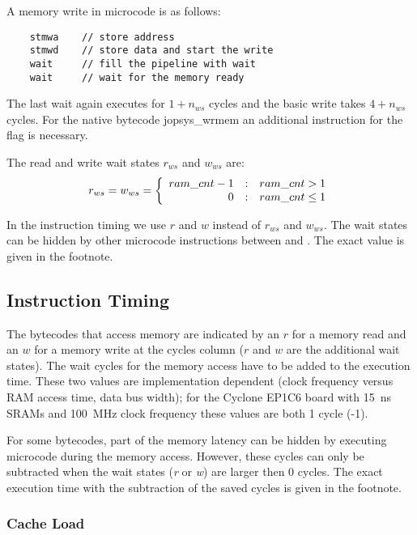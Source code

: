 A memory write in microcode is as follows:
\begin{lstlisting}
    stmwa    // store address
    stmwd    // store data and start the write
    wait     // fill the pipeline with wait
    wait     // wait for the memory ready
\end{lstlisting}
The last wait again executes for $1+n_{ws}$ cycles and the basic
write takes $4+n_{ws}$ cycles. For the native bytecode \code
{jopsys\_wrmem} an additional  instruction for the
 flag is necessary.

The read and write wait states $r_{ws}$ and $w_{ws}$ are:
\begin{equation*}
    r_{ws} = w_{ws} =
    \left\{\begin{array}{r@{\quad:\quad}l}
    ram\_cnt-1 & ram\_cnt>1 \\
    0   & ram\_cnt\le1
    \end{array} \right.
\end{equation*}

In the instruction timing we use $r$ and $w$ instead of $r_{ws}$ and
$w_{ws}$. The wait states can be hidden by other microcode
instructions between  and . The
exact value is given in the footnote.

\subsection*{Instruction Timing}

The bytecodes that access memory are indicated by an $r$ for a memory
read and an $w$ for a memory write at the cycles column ($r$ and $w$
are the additional wait states). The wait cycles for the memory
access have to be added to the execution time. These two values are
implementation dependent (clock frequency versus RAM access time,
data bus width); for the Cyclone EP1C6 board with 15~ns SRAMs and
100~MHz clock frequency these values are both 1 cycle
(-1).

For some bytecodes, part of the memory latency can be hidden by
executing microcode during the memory access. However, these cycles
can only be subtracted when the wait states (\emph{r} or \emph{w})
are larger then 0 cycles. The exact execution time with the
subtraction of the saved cycles is given in the footnote.

\subsubsection*{Cache Load}


